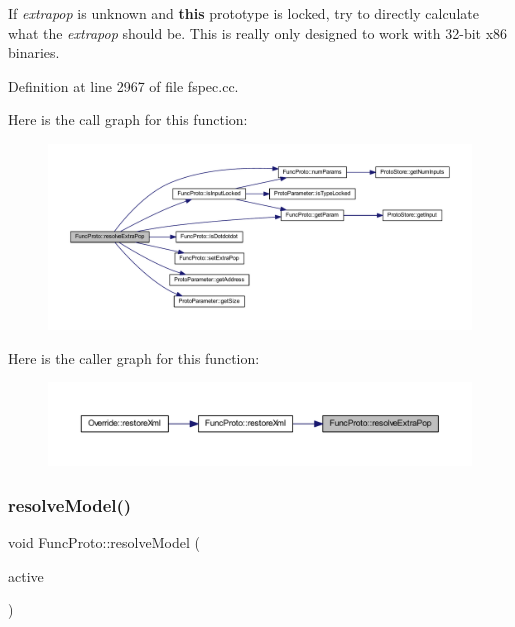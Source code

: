 If {\itshape extrapop} is unknown and {\bfseries{this}} prototype is locked, try to directly calculate what the {\itshape extrapop} should be. This is really only designed to work with 32-\/bit x86 binaries. 

Definition at line 2967 of file fspec.\+cc.

Here is the call graph for this function\+:
\nopagebreak
\begin{figure}[H]
\begin{center}
\leavevmode
\includegraphics[width=350pt]{class_func_proto_a22889d3a526dce245368b8de9c889529_cgraph}
\end{center}
\end{figure}
Here is the caller graph for this function\+:
\nopagebreak
\begin{figure}[H]
\begin{center}
\leavevmode
\includegraphics[width=350pt]{class_func_proto_a22889d3a526dce245368b8de9c889529_icgraph}
\end{center}
\end{figure}
\mbox{\label{class_func_proto_afd3b71963b55dd19755eeaccd016c4bf}} 
\subsubsection{\texorpdfstring{resolveModel()}{resolveModel()}}
{\footnotesize\ttfamily void Func\+Proto\+::resolve\+Model (\begin{DoxyParamCaption}\item[{\mbox{\hyperlink{class_param_active}{Param\+Active}} $\ast$}]{active }\end{DoxyParamCaption})}



